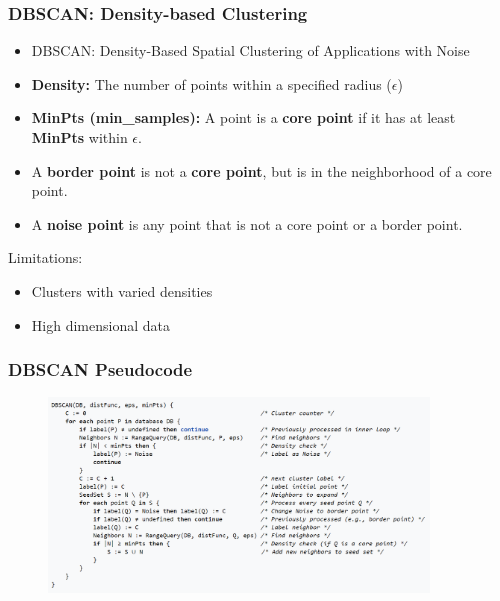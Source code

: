 \documentclass[aspectratio=169, 10pt]{beamer}
\begin{document}
\begin{frame}
    \frametitle{DBSCAN: Density-based Clustering}
    
    \begin{itemize}
        \item DBSCAN: Density-Based Spatial Clustering of Applications with Noise
        \item \textbf{Density:} The number of points within a specified radius ($\epsilon$)
        \item \textbf{MinPts (min\_samples):} A point is a \textbf{core point} if it has at least \textbf{MinPts} within $\epsilon$.
        \item A \textbf{border point} is not a \textbf{core point}, but is in the neighborhood of a core point.
        \item A \textbf{noise point} is any point that is not a core point or a border point.
    \end{itemize}

    Limitations:
    \begin{itemize}
        \item Clusters with varied densities
        \item High dimensional data
    \end{itemize}
    
\end{frame}

\begin{frame}
    \frametitle{DBSCAN Pseudocode}
    
    \begin{figure}
        \centering
        \includegraphics[width=0.9\textwidth]{../imgs/dbscan.png}
    \end{figure}
    
\end{frame}
\end{document}
